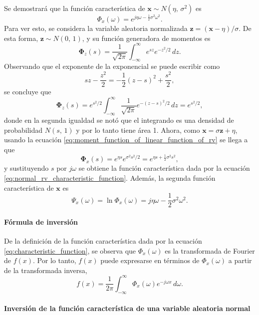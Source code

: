 \documentclass[a4paper]{report}
\newcommand{\x}{\mathbf{x}}
\newcommand{\z}{\mathbf{z}}
\newcommand{\Phibf}{\mathbf{\Phi}}
\begin{document}
Se demostrará que la función característica de \(\x\sim N(\eta,\,\sigma^2)\) es
\begin{equation}\label{eq:normal_rv_characteristic_function}
 \Phi_x(\omega)=e^{j\eta\omega-\frac{1}{2}\sigma^2\omega^2}.
\end{equation}
Para ver esto, se considera la variable aleatoria normalizada \(\z=(\x-\eta)/\sigma\). De esta forma, \(\z\sim N(0,\,1)\), y su función generadora de momentos es
\[
 \Phibf_z(s)=\frac{1}{\sqrt{2\pi}}\int_{-\infty}^{\infty}e^{sz}e^{-z^2/2}\,dz.
\]
Observando que el exponente de la exponencial se puede escribir como
\[
 sz-\frac{z^2}{2}=-\frac{1}{2}(z-s)^2+\frac{s^2}{2},
\]
se concluye que
\[
 \Phibf_z(s)=e^{s^2/2}\int_{-\infty}^{\infty}\frac{1}{\sqrt{2\pi}}e^{-(z-s)^2/2}\,dz=e^{s^2/2},
\]
donde en la segunda igualdad se notó que el integrando es una densidad de probabilidad \(N(s,\,1)\) y por lo tanto tiene área 1. Ahora, como \(\x=\sigma\z+\eta\), usando la ecuación \ref{eq:moment_function_of_linear_function_of_rv} se llega a que
\begin{equation}\label{eq:normal_rv_moment_function}
 \Phibf_x(s)=e^{\eta s}e^{\sigma^2s^2/2}=e^{\eta s+\frac{1}{2}\sigma^2s^2},
\end{equation}
y sustituyendo \(s\) por \(j\omega\) se obtiene la función característica dada por la ecuación \ref{eq:normal_rv_characteristic_function}. Además, la segunda función característica de \(\x\) es
\begin{equation}\label{eq:normal_rv_second_characteristic_function}
 \Psi_x(\omega)=\ln\Phi_x(\omega)=j\eta\omega-\frac{1}{2}\sigma^2\omega^2.
\end{equation}

\paragraph{Fórmula de inversión}

De la definición de la función característica dada por la ecuación \ref{eq:characteristic_function}, se observa que \(\Phi_x(\omega)\) es la transformada de Fourier de \(f(x)\). Por lo tanto, \(f(x)\) puede expresarse en términos de \(\Phi_x(\omega)\) a partir de la transformada inversa,
\begin{equation}\label{eq:characteristic_function_inversion}
 f(x)=\frac{1}{2\pi}\int_{-\infty}^{\infty}\Phi_x(\omega)e^{-j\omega x}\,d\omega.
\end{equation}

\paragraph{Inversión de la función característica de una variable aleatoria normal}
\end{document}
